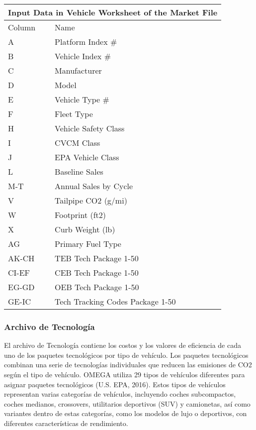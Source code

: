 \begin{center}
\begin{tabular}{ |p{2cm}||p{6cm}|}
 \hline
 \multicolumn{2}{|c|}{Input Data in Vehicle Worksheet of the Market File} \\
 \hline
 Column & Name\\
 \hline
    A & Platform Index \# \\
    B & Vehicle Index \#  \\
    C & Manufacturer     \\
    D & Model            \\
    E & Vehicle Type \#   \\
    F & Fleet Type       \\
    H & Vehicle Safety Class \\
    I & CVCM Class \\
    J & EPA Vehicle Class \\
    L & Baseline Sales \\
    M-T & Annual Sales by Cycle \\
    V & Tailpipe CO2 (g/mi) \\
    W & Footprint (ft2) \\
    X & Curb Weight (lb) \\
    AG & Primary Fuel Type \\
    AK-CH & TEB Tech Package 1-50 \\
    CI-EF & CEB Tech Package 1-50 \\
    EG-GD & OEB Tech Package 1-50 \\
    GE-IC & Tech Tracking Codes Package 1-50 \\
 \hline
\end{tabular}
\end{center}

\subsubsection{Archivo de Tecnología}

El archivo de Tecnología contiene los costos y los valores de eficiencia de cada uno de los paquetes tecnológicos por tipo de vehículo. Los paquetes tecnológicos combinan una serie de tecnologías individuales que reducen las emisiones de CO2 según el tipo de vehículo. OMEGA utiliza 29 tipos de vehículos diferentes para asignar paquetes tecnológicos (U.S. EPA, 2016). \cite{EPA_2016-B} Estos tipos de vehículos representan varias categorías de vehículos, incluyendo coches subcompactos, coches medianos, crossovers, utilitarios deportivos (SUV) y camionetas, así como variantes dentro de estas categorías, como los modelos de lujo o deportivos, con diferentes características de rendimiento. \cite{OMEGA_Mexico}

